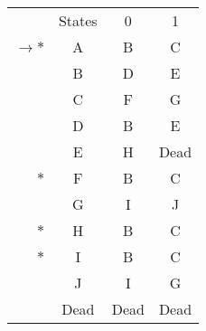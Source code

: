 \begin{tabular}[c]{r|c|c|c|} \cline{2-4}
    & States & 0 & 1 \\ \cline{2-4}
    $\rightarrow *$ & A & B & C \\ \cline{2-4}
    & B & D & E  \\ \cline{2-4}
    & C & F & G \\ \cline{2-4}
    & D & B & E \\ \cline{2-4}
    & E & H & Dead \\ \cline{2-4}
    $*$ & F & B & C \\ \cline{2-4}
    & G & I & J \\ \cline{2-4}
    $*$ & H & B & C \\ \cline{2-4}
    $*$ & I & B & C \\ \cline{2-4}
    & J & I & G \\ \cline{2-4}
    & Dead & Dead & Dead \\ \cline{2-4}
\end{tabular}
